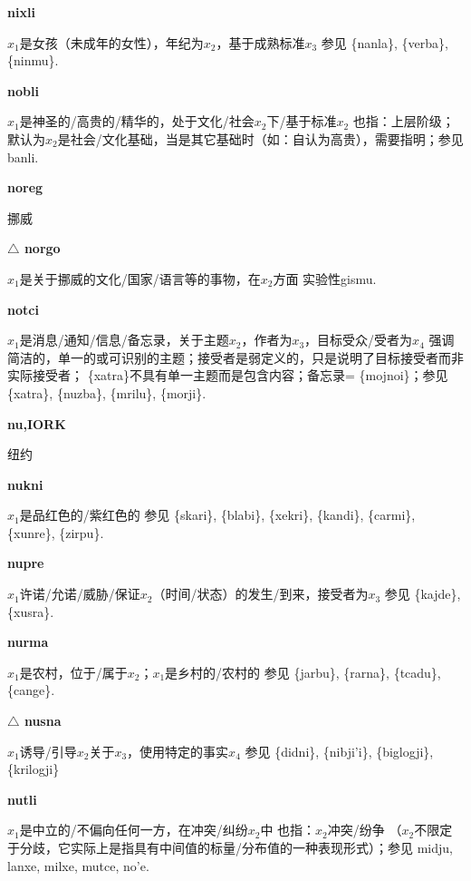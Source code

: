 \documentclass[notitlepage,twocolumn,a4paper,10pt]{book}
\begin{document}
{\sffamily\bfseries nixli}  $x_1$是女孩（未成年的女性），年纪为$x_2$，基于成熟标准$x_3$ \textemdash{} 参见 \{nanla\}, \{verba\}, \{ninmu\}.

{\sffamily\bfseries nobli}\enspace {\ttfamily\bfseries[nol     no'i]}  $x_1$是神圣的\slash{}高贵的\slash{}精华的，处于文化\slash{}社会$x_2$下\slash{}基于标准$x_2$ \textemdash{} 也指：上层阶级；默认为$x_2$是社会\slash{}文化基础，当是其它基础时（如：自认为高贵），需要指明；参见 {banli}.

{\sffamily\bfseries noreg} 挪威

{\sffamily\bfseries $\triangle$ norgo} $x_1$是关于挪威的文化\slash{}国家\slash{}语言等的事物，在$x_2$方面 \textemdash{} 实验性gismu.

{\sffamily\bfseries notci}  $x_1$是消息\slash{}通知\slash{}信息\slash{}备忘录，关于主题$x_2$，作者为$x_3$，目标受众\slash{}受者为$x_4$ \textemdash{} 强调简洁的，单一的或可识别的主题；接受者是弱定义的，只是说明了目标接受者而非实际接受者； \{xatra\}不具有单一主题而是包含内容；备忘录= \{mojnoi\}；参见 \{xatra\}, \{nuzba\}, \{mrilu\}, \{morji\}.

{\sffamily\bfseries nu,IORK} 纽约

{\sffamily\bfseries nukni}\enspace {\ttfamily\bfseries[nuk]}  $x_1$是品红色的\slash{}紫红色的 \textemdash{} 参见 \{skari\}, \{blabi\}, \{xekri\}, \{kandi\}, \{carmi\}, \{xunre\}, \{zirpu\}.

{\sffamily\bfseries nupre}\enspace {\ttfamily\bfseries[nup     nu'e]}  $x_1$许诺\slash{}允诺\slash{}威胁\slash{}保证$x_2$（时间\slash{}状态）的发生\slash{}到来，接受者为$x_3$ \textemdash{} 参见 \{kajde\}, \{xusra\}.

{\sffamily\bfseries nurma}\enspace {\ttfamily\bfseries[num]}  $x_1$是农村，位于\slash{}属于$x_2$；$x_1$是乡村的\slash{}农村的 \textemdash{} 参见 \{jarbu\}, \{rarna\}, \{tcadu\}, \{cange\}.

{\sffamily\bfseries $\triangle$ nusna} $x_1$诱导\slash{}引导$x_2$关于$x_3$，使用特定的事实$x_4$ \textemdash{} 参见 \{didni\}, \{nibji'i\}, \{biglogji\}, \{krilogji\}

{\sffamily\bfseries nutli}\enspace {\ttfamily\bfseries[nul     nu'i]}  $x_1$是中立的\slash{}不偏向任何一方，在冲突\slash{}纠纷$x_2$中 \textemdash{} 也指：$x_2$冲突\slash{}纷争 （$x_2$不限定于分歧，它实际上是指具有中间值的标量\slash{}分布值的一种表现形式）；参见 {midju}, {lanxe}, {milxe}, {mutce}, {no'e}.
\end{document}
